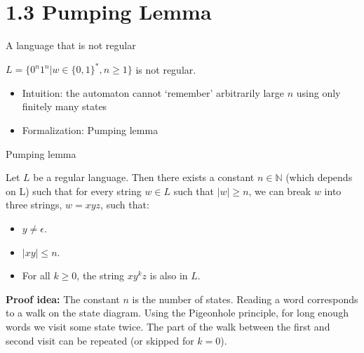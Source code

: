 \documentclass[handout]{beamer}
\begin{document}
\section{1.3 Pumping Lemma}


\begin{frame}{A language that is not regular}

    \begin{example}
        $L=\{0^n1^n|  w\in \{0,1\}^*,n\geq 1\}$ is not regular.
    \end{example}

    \begin{itemize}
        \item \alert{Intuition:} the automaton cannot `remember' arbitrarily large $n$ using only finitely many states    
    
        \item \alert{Formalization:} Pumping lemma
    \end{itemize}
    
\end{frame}


\begin{frame}{Pumping lemma}

    \begin{theorem}
		Let $L$ be a regular language. Then there exists a constant $n\in \mathbb{N}$ (which depends on L) such that for every string $w\in L$ such that $|w|\geq n$, we can break $w$ into three strings, $w=xyz$, such that:
		
		\begin{itemize}
			\item $y\neq \epsilon$.
			\item $|xy|\leq n$.
			\item For all $k\geq 0$, the string $xy^kz$ is also in $L$.
		\end{itemize}
	\end{theorem}

    \textbf{Proof idea:} The constant $n$ is the number of states. Reading a word corresponds to a walk on the state diagram. Using the Pigeonhole principle, for long enough words we visit some state twice. The part of the walk between the first and second visit can be repeated (or skipped for $k=0$).

\end{frame}
\end{document}

